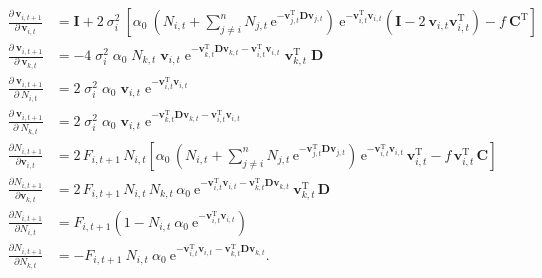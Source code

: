 \begin{equation*}
\begin{split}
    \frac{ \partial \, \mathbf{v}_{i,t+1} }{ \partial \, \mathbf{v}_{i,t} } &= 
    \mathbf{I} + 2 ~ \sigma_i^2 ~
        \left[
            \alpha_0 ~ \left(
                N_{i,t} + \sum_{j \ne i}^{n}{ N_{j,t} \, \textrm{e}^{
                - \mathbf{v}_{j,t}^{\textrm{T}}
                \mathbf{D} \mathbf{v}_{j,t} } }
            \right) ~ \textrm{e}^{ - \mathbf{v}_{i,t}^{\textrm{T}} \mathbf{v}_{i,t} }
            \left(
                \mathbf{I} - 2 ~ \mathbf{v}_{i,t} \mathbf{v}_{i,t}^{\textrm{T}}
            \right) -
            f \: \mathbf{C}^{\textrm{T}}
        \right] \\
    \frac{ \partial \: \mathbf{v}_{i,t+1} }{ \partial \: \mathbf{v}_{k,t}} &=
        -4 \; \sigma_i^2 \; \alpha_0 \; N_{k,t} \; \mathbf{v}_{i,t} \;
        \textrm{e}^{
                    - \mathbf{v}_{k,t}^{\textrm{T}} \mathbf{D} \mathbf{v}_{k,t}
                    - \mathbf{v}_{i,t}^{\textrm{T}} \mathbf{v}_{i,t}
                } \;
        \mathbf{v}_{k,t}^{\textrm{T}} \; \mathbf{D} \\
% 
    \frac{ \partial \: \mathbf{v}_{i,t+1} }{ \partial \: N_{i,t} } &=
        2 \; \sigma_i^2 \; \alpha_0 \; \mathbf{v}_{i,t} \;
        \textrm{e}^{ - \mathbf{v}_{i,t}^{\textrm{T}} \mathbf{v}_{i,t} } \\
    \frac{ \partial \: \mathbf{v}_{i,t+1} }{ \partial \: N_{k,t} } &=
        2 \; \sigma_i^2 \; \alpha_0 \; \mathbf{v}_{i,t} \;
        \textrm{e}^{ - \mathbf{v}_{k,t}^{\textrm{T}} \mathbf{D} \mathbf{v}_{k,t}
            - \mathbf{v}_{i,t}^{\textrm{T}} \mathbf{v}_{i,t} } \\
% 
    \frac{ \partial N_{i,t+1} }{ \partial \mathbf{v}_{i,t} } &= 
        2 \, F_{i,t+1} \,  N_{i,t}
        \left[
            \alpha_0 \, \left(
                N_{i,t} + \sum_{j \ne i}^{n}{ N_{j,t} \, \textrm{e}^{
                - \mathbf{v}_{j,t}^{\textrm{T}}
                \mathbf{D} \mathbf{v}_{j,t} } }
            \right) \, \text{e}^{ -\mathbf{v}_{i,t}^{\text{T}}
            \mathbf{v}_{i,t} } \, \mathbf{v}_{i,t}^{\text{T}}
            - f \, \mathbf{v}_{i,t}^{\text{T}} \, \mathbf{C}
        \right] \\
    \frac{ \partial N_{i,t+1} }{ \partial \mathbf{v}_{k,t} } &= 
        2 \, F_{i,t+1} \, N_{i,t} \, N_{k,t} \, \alpha_0 \: 
        \text{e}^{ -\mathbf{v}_{i,t}^{\text{T}} \mathbf{v}_{i,t} -
            \mathbf{v}_{k,t}^{\text{T}} \mathbf{D} \mathbf{v}_{k,t} } \:
        \mathbf{v}_{k,t}^{\text{T}} \, \mathbf{D} \\
% 
    \frac{ \partial N_{i,t+1} }{ \partial N_{i,t} } &= 
        F_{i,t+1}
        \left(
            1 - N_{i,t} \: \alpha_0 \: 
            \text{e}^{ -\mathbf{v}_{i,t}^{\text{T}} \mathbf{v}_{i,t} } 
        \right) \\
    \frac{ \partial N_{i,t+1} }{ \partial N_{k,t} } &= 
        - F_{i,t+1} \: N_{i,t} \: \alpha_0 \: 
        \text{e}^{ -\mathbf{v}_{i,t}^{\text{T}} \mathbf{v}_{i,t} -
            \mathbf{v}_{k,t}^{\text{T}} \mathbf{D} \mathbf{v}_{k,t} } 
    \textrm{.}
\end{split}
\end{equation*}



